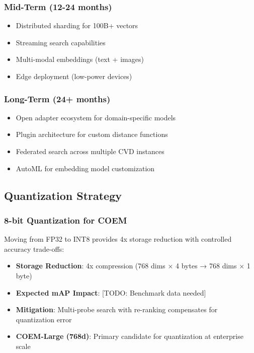 \subsubsection{Mid-Term (12-24 months)}
\begin{itemize}[noitemsep]
    \item Distributed sharding for 100B+ vectors
    \item Streaming search capabilities
    \item Multi-modal embeddings (text + images)
    \item Edge deployment (low-power devices)
\end{itemize}

\subsubsection{Long-Term (24+ months)}
\begin{itemize}[noitemsep]
    \item Open adapter ecosystem for domain-specific models
    \item Plugin architecture for custom distance functions
    \item Federated search across multiple CVD instances
    \item AutoML for embedding model customization
\end{itemize}

\subsection{Quantization Strategy}

\subsubsection{8-bit Quantization for COEM}

Moving from FP32 to INT8 provides 4x storage reduction with controlled accuracy trade-offs:


\begin{itemize}[noitemsep]
    \item \textbf{Storage Reduction}: 4x compression (768 dims × 4 bytes → 768 dims × 1 byte)
    \item \textbf{Expected mAP Impact}: [TODO: Benchmark data needed]
    \item \textbf{Mitigation}: Multi-probe search with re-ranking compensates for quantization error
    \item \textbf{COEM-Large (768d)}: Primary candidate for quantization at enterprise scale
\end{itemize}

